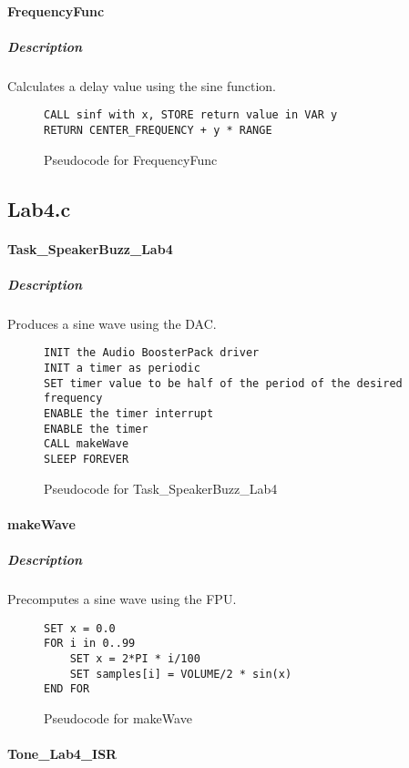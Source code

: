 \documentclass[titlepage]{article}
\begin{document}
\paragraph{FrequencyFunc}

\subparagraph{Description}
Calculates a delay value using the sine function.

\begin{figure}[H]
    \begin{verbatim}
CALL sinf with x, STORE return value in VAR y
RETURN CENTER_FREQUENCY + y * RANGE
    \end{verbatim}
    \caption{Pseudocode for FrequencyFunc}
\end{figure}

\subsection{Lab4.c}

\paragraph{Task\_SpeakerBuzz\_Lab4}
\subparagraph{Description}
Produces a sine wave using the DAC.

\begin{figure}[H]
    \begin{verbatim}
INIT the Audio BoosterPack driver
INIT a timer as periodic
SET timer value to be half of the period of the desired frequency
ENABLE the timer interrupt
ENABLE the timer
CALL makeWave
SLEEP FOREVER
    \end{verbatim}
    \caption{Pseudocode for Task\_SpeakerBuzz\_Lab4}
\end{figure}

\paragraph{makeWave}

\subparagraph{Description}
Precomputes a sine wave using the FPU.

\begin{figure}[H]
    \begin{verbatim}
SET x = 0.0
FOR i in 0..99
    SET x = 2*PI * i/100
    SET samples[i] = VOLUME/2 * sin(x)
END FOR
    \end{verbatim}
    \caption{Pseudocode for makeWave}
\end{figure}

\paragraph{Tone\_Lab4\_ISR}
\end{document}
